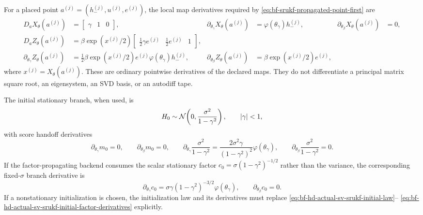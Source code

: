 For a placed point \(a^{(j)}=(h_-^{(j)},u^{(j)},e^{(j)})\), the local map
derivatives required by
\eqref{eq:bf-srukf-propagated-point-first} are
\begin{align}
  D_a X_\theta(a^{(j)})
    &=
    \begin{bmatrix}\gamma&1&0\end{bmatrix},
    &
  \partial_{\theta_\gamma}X_\theta(a^{(j)})
    &=
    \varphi(\theta_\gamma)h_-^{(j)},
    &
  \partial_{\theta_\beta}X_\theta(a^{(j)})
    &=0,
    \label{eq:bf-hd-actual-sv-srukf-transition-derivatives}\\
  D_a Z_\theta(a^{(j)})
    &=
    \beta\exp(x^{(j)}/2)
    \begin{bmatrix}
      \frac12\gamma e^{(j)}&
      \frac12 e^{(j)}&
      1
    \end{bmatrix},
    \label{eq:bf-hd-actual-sv-srukf-observation-state-derivative}\\
  \partial_{\theta_\gamma}Z_\theta(a^{(j)})
    &=
    \frac12
    \beta\exp(x^{(j)}/2)e^{(j)}
    \varphi(\theta_\gamma)h_-^{(j)},
    &
  \partial_{\theta_\beta}Z_\theta(a^{(j)})
    &=
    \beta\exp(x^{(j)}/2)e^{(j)},
    \label{eq:bf-hd-actual-sv-srukf-observation-parameter-derivatives}
\end{align}
where \(x^{(j)}=X_\theta(a^{(j)})\).  These are ordinary pointwise derivatives
of the declared maps.  They do not differentiate a principal matrix square
root, an eigensystem, an SVD basis, or an autodiff tape.

The initial stationary branch, when used, is
\begin{equation}
  H_0\sim\mathcal{N}\!\left(0,\frac{\sigma^2}{1-\gamma^2}\right),
  \qquad |\gamma|<1,
  \label{eq:bf-hd-actual-sv-srukf-initial-law}
\end{equation}
with score handoff derivatives
\begin{equation}
  \partial_{\theta_\gamma}m_0=0,\qquad
  \partial_{\theta_\beta}m_0=0,\qquad
  \partial_{\theta_\gamma}
  \frac{\sigma^2}{1-\gamma^2}
  =
  \frac{2\sigma^2\gamma}{(1-\gamma^2)^2}\varphi(\theta_\gamma),
  \qquad
  \partial_{\theta_\beta}
  \frac{\sigma^2}{1-\gamma^2}=0.
  \label{eq:bf-hd-actual-sv-srukf-initial-derivatives}
\end{equation}
If the factor-propagating backend consumes the scalar stationary factor
\(c_0=\sigma(1-\gamma^2)^{-1/2}\) rather than the variance, the corresponding
fixed-\(\sigma\) branch derivative is
\begin{equation}
  \partial_{\theta_\gamma}c_0
  =
  \sigma\gamma(1-\gamma^2)^{-3/2}\varphi(\theta_\gamma),
  \qquad
  \partial_{\theta_\beta}c_0=0.
  \label{eq:bf-hd-actual-sv-srukf-initial-factor-derivatives}
\end{equation}
If a nonstationary initialization is chosen, the initialization law and its
derivatives must replace \eqref{eq:bf-hd-actual-sv-srukf-initial-law}--
\eqref{eq:bf-hd-actual-sv-srukf-initial-factor-derivatives} explicitly.

